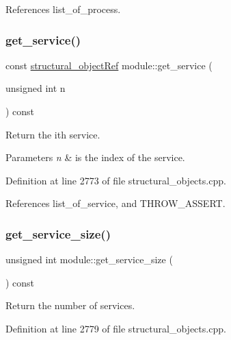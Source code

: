 References list\+\_\+of\+\_\+process.

\mbox{\label{classmodule_a9b9c1372c038a2e6c89160422c68643e}} 
\subsubsection{\texorpdfstring{get\+\_\+service()}{get\_service()}}
{\footnotesize\ttfamily const \hyperlink{structural__objects_8hpp_a8ea5f8cc50ab8f4c31e2751074ff60b2}{structural\+\_\+object\+Ref} module\+::get\+\_\+service (\begin{DoxyParamCaption}\item[{unsigned int}]{n }\end{DoxyParamCaption}) const}



Return the ith service. 


\begin{DoxyParams}{Parameters}
{\em n} & is the index of the service. \\
\hline
\end{DoxyParams}


Definition at line 2773 of file structural\+\_\+objects.\+cpp.



References list\+\_\+of\+\_\+service, and T\+H\+R\+O\+W\+\_\+\+A\+S\+S\+E\+RT.

\mbox{\label{classmodule_af9e0fc6992cc24221a6ab32b4acafda3}} 
\subsubsection{\texorpdfstring{get\+\_\+service\+\_\+size()}{get\_service\_size()}}
{\footnotesize\ttfamily unsigned int module\+::get\+\_\+service\+\_\+size (\begin{DoxyParamCaption}{ }\end{DoxyParamCaption}) const}



Return the number of services. 



Definition at line 2779 of file structural\+\_\+objects.\+cpp.



